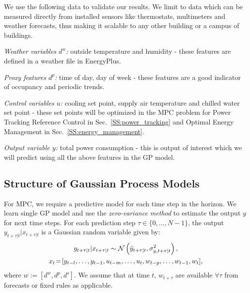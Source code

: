 We use the following data to validate our results. We limit to data which can be measured directly from installed sensors like thermostats, multimeters and weather forecasts, thus making it scalable to any other building or a campus of buildings.

\textit{Weather variables \(d^w\):} outside temperature and humidity - these features are defined in a weather file in EnergyPlus.

\textit{Proxy features \(d^p\):} time of day, day of week - these features are a good indicator of occupancy and periodic trends.

\textit{Control variables \(u\):} cooling set point, supply air temperature and chilled water set point - these set points will be optimized in the MPC problem for Power Tracking Reference Control in Sec.~\ref{SS:power_tracking} and Optimal Energy Management in Sec.~\ref{SS:energy_management}.

\textit{Output variable \(y\):} total power consumption - this is output of interest which we will predict using all the above features in the GP model.

\subsection{Structure of  Gaussian Process Models}
\label{SS:casestudy:gp}

For MPC, we require a predictive model for each time step in the horizon.
We learn single GP model and use the \emph{zero-variance method} to estimate the output \(y\) for next time steps. For each prediction step \( \tau \in \{0,\dots,N-1\}\), the output \(y_{t+\tau|t} | x_{t+\tau|t}\) is a Gaussian random variable given by:
\begin{gather}
\label{E:gp:casestudy}
y_{t+\tau|t} | x_{t+\tau|t} \sim \GaussianDist{\bar{y}_{t+\tau|t}}{\sigma^2_{y,t+\tau|t}}, \\
x_{t}\!=\![y_{t-l}, \dots, y_{t-1}, u_{t-m}, \dots, u_t, w_{t-p}, \dots, w_{t-1}, w_t], \nonumber
\end{gather}
where \(w:=[d^w, d^p, d^s]\). We assume that at time \(t\), \(w_{t+\tau}\) are available \(\forall \tau \) from forecasts or fixed rules as applicable.

